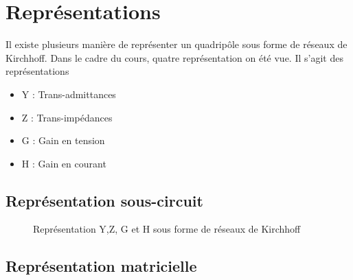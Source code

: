 \section{Représentations}
Il existe plusieurs manière de représenter un quadripôle sous forme de réseaux de Kirchhoff. Dans le cadre du cours, quatre représentation on été vue. Il s'agit des représentations
\begin{itemize}
\item Y : Trans-admittances
\item Z : Trans-impédances
\item G : Gain en tension
\item H : Gain en courant
\end{itemize}
\subsection{Représentation sous-circuit}
\begin{figure} [!h]
\centering

\caption{\label{fig:representation_quadripole}Représentation Y,Z, G et H sous forme de réseaux de Kirchhoff}
\end{figure}
\subsection{Représentation matricielle}
